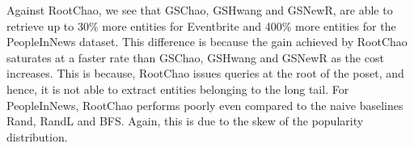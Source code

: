Against RootChao, we see that GSChao, GSHwang and GSNewR, are able to retrieve up to 30\% more entities for Eventbrite and 400\% more entities for the PeopleInNews dataset. This difference is because the gain achieved by RootChao saturates at a faster rate than GSChao, GSHwang and GSNewR as the cost increases. This is because, RootChao issues queries at the root of the poset, and hence, it is not able to extract entities belonging to the long tail. For PeopleInNews, RootChao performs poorly even compared to the naive baselines Rand, RandL and BFS. Again, this is due to the skew of the popularity distribution.

\begin{figure}
\begin{center}

\end{center}
\end{figure}
